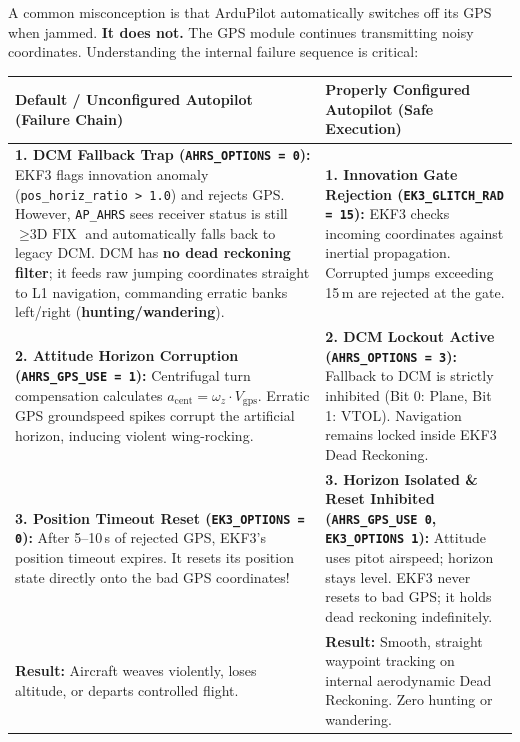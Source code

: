 \documentclass[10pt,letterpaper]{article}
\begin{document}
\vspace{0.8mm}
\noindent
A common misconception is that ArduPilot automatically switches off its GPS when jammed. \textbf{It does not.} The GPS module continues transmitting noisy coordinates. Understanding the internal failure sequence is critical:

\vspace{1mm}
\noindent
\footnotesize
\renewcommand{\arraystretch}{1.18}
\begin{tabularx}{\textwidth}{L{0.48\textwidth} | Y}
\toprule
{}
\textbf{Default / Unconfigured Autopilot (Failure Chain)} & \textbf{Properly Configured Autopilot (Safe Execution)} \\
\midrule
\textbf{1. DCM Fallback Trap (\texttt{AHRS\_OPTIONS = 0}):} \newline
EKF3 flags innovation anomaly (\texttt{pos\_horiz\_ratio > 1.0}) and rejects GPS. However, \texttt{AP\_AHRS} sees receiver status is still $\ge \text{3D FIX}$ and automatically falls back to legacy DCM. DCM has \textbf{no dead reckoning filter}; it feeds raw jumping coordinates straight to L1 navigation, commanding erratic banks left/right (\textbf{hunting/wandering}). & 
\textbf{1. Innovation Gate Rejection (\texttt{EK3\_GLITCH\_RAD = 15}):} \newline
EKF3 checks incoming coordinates against inertial propagation. Corrupted jumps exceeding 15\,m are rejected at the gate. \\
\textbf{2. Attitude Horizon Corruption (\texttt{AHRS\_GPS\_USE = 1}):} \newline
Centrifugal turn compensation calculates $a_{\text{cent}} = \omega_z \cdot V_{\text{gps}}$. Erratic GPS groundspeed spikes corrupt the artificial horizon, inducing violent wing-rocking. & 
\textbf{2. DCM Lockout Active (\texttt{AHRS\_OPTIONS = 3}):} \newline
Fallback to DCM is strictly inhibited (Bit 0: Plane, Bit 1: VTOL). Navigation remains locked inside EKF3 Dead Reckoning. \\
\textbf{3. Position Timeout Reset (\texttt{EK3\_OPTIONS = 0}):} \newline
After 5--10\,s of rejected GPS, EKF3's position timeout expires. It resets its position state directly onto the bad GPS coordinates! & 
\textbf{3. Horizon Isolated \& Reset Inhibited (\texttt{AHRS\_GPS\_USE 0}, \texttt{EK3\_OPTIONS 1}):} \newline
Attitude uses pitot airspeed; horizon stays level. EKF3 never resets to bad GPS; it holds dead reckoning indefinitely. \\
\textbf{Result:} Aircraft weaves violently, loses altitude, or departs controlled flight. & 
\textbf{Result:} Smooth, straight waypoint tracking on internal aerodynamic Dead Reckoning. Zero hunting or wandering. \\
\bottomrule
\end{tabularx}
\end{document}
